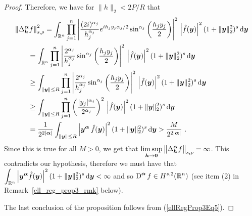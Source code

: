 \begin{proof}
Therefore, we have for $\displaystyle \|h\|_2 < 2P/R$ that
\begin{align*}
&\left\| \Delta^{{\bm{\alpha}}}_{{\bm{h}}} f \right\|_{s,\rho}^2
= \int_{\mathbb{R}^n} \prod_{j=1}^n \left| \frac{(2i)^{\alpha_j}}{h_j^{\alpha_j}}
e^{i h_j y_j \alpha_j/2} \sin^{\alpha_j}\left(\frac{h_j y_j}{2}\right) \right|^2
\,\left| \hat{f}({\bm{y}})\right|^2 (1+\|{\bm{y}}\|_2^2)^s \,\mathrm{d}{{\bm{y}}} \\
&\qquad = \int_{\mathbb{R}^n}
\prod_{j=1}^n \left| \frac{2^{\alpha_j}}{h_j^{\alpha_j}}
\sin^{\alpha_j}\left(\frac{h_j y_j}{2}\right) \right|^2
\,\left| \hat{f}({\bm{y}})\right|^2 (1+\|{\bm{y}}\|_2^2)^s \,\mathrm{d}{{\bm{y}}} \\
&\qquad \geq \int_{\|{\bm{y}}\|\leq R} 
\prod_{j=1}^n \left| \frac{2^{\alpha_j}}{h_j^{\alpha_j}}
\sin^{\alpha_j}\left(\frac{h_j y_j}{2}\right) \right|^2
\,\left| \hat{f}({\bm{y}})\right|^2 (1+\|{\bm{y}}\|_2^2)^s \,\mathrm{d}{{\bm{y}}} \\
&\qquad \geq \int_{\|{\bm{y}}\|\leq R}
\prod_{j=1}^n \left( \frac{|y_j|^{\alpha_j}}{2^{\alpha_j}} \right)^2
\,\left| \hat{f}({\bm{y}})\right|^2 (1+\|{\bm{y}}\|_2^2)^s \,\mathrm{d}{{\bm{y}}} \\
&\qquad = \frac{1}{2^{2|{\bm{\alpha}}|}} \int_{\|{\bm{y}}\|\leq R}
\left| {\bm{y}}^{{\bm{\alpha}}} \, \hat{f}({\bm{y}}) \right|^2
(1+\|{\bm{y}}\|_2^2)^s \,\mathrm{d}{{\bm{y}}}
> \frac{M}{2^{2|{\bm{\alpha}}|}} \ .
\end{align*}
Since this is true for all $M>0$, we get that
$\displaystyle \limsup_{{\bm{h}}\rightarrow {\bm{0}}}
\big\|\Delta^{{\bm{\alpha}}}_{{\bm{h}}} f\big\|_{s,\rho} = \infty$.
This contradicts our hypothesis, therefore we must have that
$\displaystyle
\int_{\mathbb{R}^n} \left| {\bm{y}}^{{\bm{\alpha}}} \hat{f}({\bm{y}})\right|^2
(1 + \|{\bm{y}}\|_2^2)^s \,\mathrm{d}{{\bm{y}}} < \infty$
and so $\displaystyle \operatorname{D}^{{\bm{\alpha}}} f \in H^{s,2}(\mathbb{R}^n)$ (see
item (2) in Remark~\ref{ell_reg_prop3_rmk} below).

  The last conclusion of the proposition follows
from (\ref{ellRegProp3Eq5}).
\end{proof}


